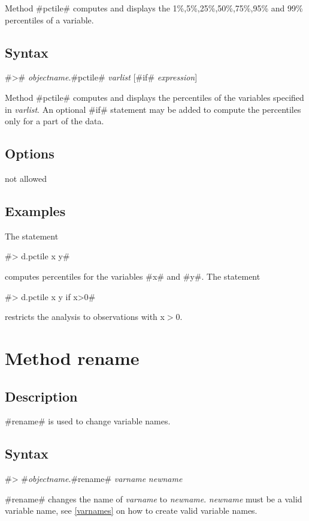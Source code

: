 Method #pctile# computes and displays the
1\%,5\%,25\%,50\%,75\%,95\% and 99\%  percentiles of a variable.

\subsection*{Syntax}

#># {\em objectname}.#pctile# {\em varlist} [#if# {\em expression}]

Method #pctile# computes and displays the percentiles of the
variables specified in {\em varlist}. An optional #if# statement
may be added to compute the percentiles only for a part of the
data.

\subsection*{Options}

not allowed

\subsection*{Examples}

The statement

#> d.pctile x y#

computes percentiles for the variables #x# and #y#.
The statement

#> d.pctile x y if x>0#

restricts the analysis to observations with x$>$0.


\section{Method rename}
 


\label{rename}


\subsection*{Description}

#rename# is used to change variable names.


\subsection*{Syntax}

#> #{\em objectname}.#rename# {\em varname} {\em newname}

#rename# changes the name of {\em varname} to {\em newname}. {\em
newname} must be a valid variable name, see \autoref{varnames} on
how to create valid variable names.


